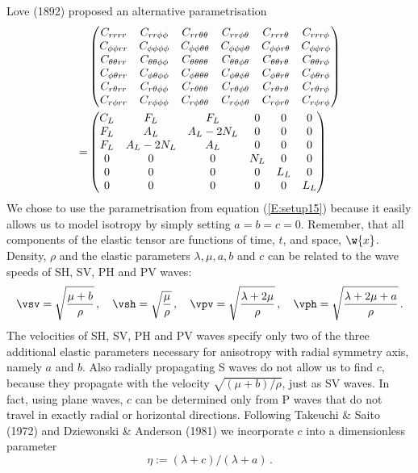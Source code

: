Love (1892) proposed an alternative parametrisation
\begin{align}\label{E:setup15b}
&\begin{pmatrix}
C_{r r r r} & C_{r r \phi \phi} & C_{r r \theta \theta} & C_{r r \phi \theta} & C_{r r r \theta} & C_{r r r \phi} \\
C_{\phi \phi r r} & C_{\phi \phi \phi \phi} & C_{\phi \phi \theta \theta} & C_{\phi \phi \phi \theta} & C_{\phi \phi r \theta} & C_{\phi \phi r \phi} \\
C_{\theta \theta r r} & C_{\theta \theta \phi \phi} & C_{\theta \theta \theta \theta} & C_{\theta \theta \phi \theta} & C_{\theta \theta r \theta} & C_{\theta \theta r \phi} \\
C_{\phi \theta r r} & C_{\phi \theta \phi \phi} & C_{\phi \theta \theta \theta} & C_{\phi \theta \phi \theta} & C_{\phi \theta r \theta} & C_{\phi \theta r \phi} \\
C_{r \theta r r} & C_{r \theta \phi \phi} & C_{r \theta \theta \theta} & C_{r \theta \phi \theta} & C_{r \theta r \theta} & C_{r \theta r \phi} \\
C_{r \phi r r} & C_{r \phi \phi \phi} & C_{r \phi \theta \theta} &
C_{r \phi \phi \theta} & C_{r \phi r \theta} & C_{r \phi r \phi}
\end{pmatrix}\notag\\
=&
\begin{pmatrix}
C_L & F_L & F_L & 0 & 0 & 0 \\
F_L & A_L & A_L-2N_L & 0 & 0 & 0 \\
F_L & A_L-2N_L & A_L & 0 & 0 & 0 \\
0 & 0 & 0 & N_L & 0 & 0 \\
0 & 0 & 0 & 0 & L_L & 0 \\
0 & 0 & 0 & 0 & 0 & L_L
\end{pmatrix}
\end{align}
We chose to use the parametrisation from equation (\ref{E:setup15})
because it easily allows us to model isotropy by simply setting
$a=b=c=0$. Remember, that all components of the elastic tensor are
functions of time, $t$, and space, $\w{x}$. Density, $\rho$ and the
elastic parameters $\lambda, \mu, a, b$ and $c$ can be related to
the wave speeds of SH, SV, PH and PV waves:
\begin{equation}\label{E:svsh17}
\vsv=\sqrt{\frac{\mu+b}{\rho}}\,,\quad
\vsh=\sqrt{\frac{\mu}{\rho}}\,,\quad
\vpv=\sqrt{\frac{\lambda+2\mu}{\rho}}\,,\quad
\vph=\sqrt{\frac{\lambda+2\mu+a}{\rho}}\,.
\end{equation}
The velocities of SH, SV, PH and PV waves specify only two of the
three additional elastic parameters necessary for anisotropy with
radial symmetry axis, namely $a$ and $b$. Also radially propagating
S waves do not allow us to find $c$, because they propagate with the
velocity $\sqrt{(\mu+b)/\rho}$, just as SV waves. In fact, using
plane waves, $c$ can be determined only from P waves that do not
travel in exactly radial or horizontal directions. Following
Takeuchi \& Saito (1972) and Dziewonski \& Anderson (1981) we
incorporate $c$ into a dimensionless parameter
\begin{equation}\label{E:pvph007}
\eta:=(\lambda+c)/(\lambda+a)\,.
\end{equation}

